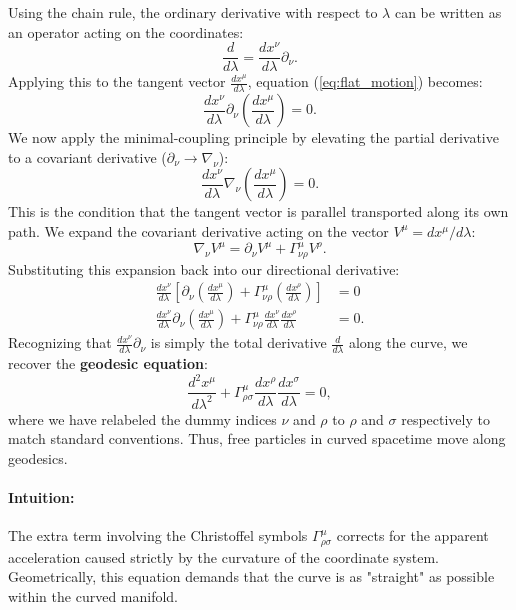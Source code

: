 \documentclass[11pt, a4paper]{report}
\begin{document}
Using the chain rule, the ordinary derivative with respect to $\lambda$ can be written as an operator acting on the coordinates:
\begin{equation}
\frac{d}{d\lambda} = \frac{dx^{\nu}}{d\lambda}\partial_{\nu}.
\end{equation}
Applying this to the tangent vector $\frac{dx^{\mu}}{d\lambda}$, equation (\ref{eq:flat_motion}) becomes:
\begin{equation}
\label{eq:flat_motion_chain}
\frac{dx^{\nu}}{d\lambda}\partial_{\nu}\left(\frac{dx^{\mu}}{d\lambda}\right) = 0.
\end{equation}
We now apply the minimal-coupling principle by elevating the partial derivative to a covariant derivative ($\partial_{\nu} \rightarrow \nabla_{\nu}$):
\begin{equation}
\frac{dx^{\nu}}{d\lambda}\nabla_{\nu}\left(\frac{dx^{\mu}}{d\lambda}\right) = 0.
\end{equation}
This is the condition that the tangent vector is parallel transported along its own path. We expand the covariant derivative acting on the vector $V^{\mu} = dx^{\mu}/d\lambda$:
\begin{equation}
\nabla_{\nu} V^{\mu} = \partial_{\nu} V^{\mu} + \Gamma^{\mu}_{\nu\rho} V^{\rho}.
\end{equation}
Substituting this expansion back into our directional derivative:
\begin{align}
\frac{dx^{\nu}}{d\lambda} \left[ \partial_{\nu}\left(\frac{dx^{\mu}}{d\lambda}\right) + \Gamma^{\mu}_{\nu\rho}\left(\frac{dx^{\rho}}{d\lambda}\right) \right] &= 0 \nonumber \\
\frac{dx^{\nu}}{d\lambda} \partial_{\nu}\left(\frac{dx^{\mu}}{d\lambda}\right) + \Gamma^{\mu}_{\nu\rho}\frac{dx^{\nu}}{d\lambda}\frac{dx^{\rho}}{d\lambda} &= 0.
\end{align}
Recognizing that $\frac{dx^{\nu}}{d\lambda} \partial_{\nu}$ is simply the total derivative $\frac{d}{d\lambda}$ along the curve, we recover the \textbf{geodesic equation}:
\begin{equation}
\label{eq:geodesic_derivation}
\frac{d^{2}x^{\mu}}{d\lambda^{2}} + \Gamma^{\mu}_{\rho\sigma}\frac{dx^{\rho}}{d\lambda}\frac{dx^{\sigma}}{d\lambda} = 0,
\end{equation}
where we have relabeled the dummy indices $\nu$ and $\rho$ to $\rho$ and $\sigma$ respectively to match standard conventions. Thus, free particles in curved spacetime move along geodesics.

\paragraph{Intuition:} The extra term involving the Christoffel symbols $\Gamma^{\mu}_{\rho\sigma}$ corrects for the apparent acceleration caused strictly by the curvature of the coordinate system. Geometrically, this equation demands that the curve is as "straight" as possible within the curved manifold.
\end{document}
